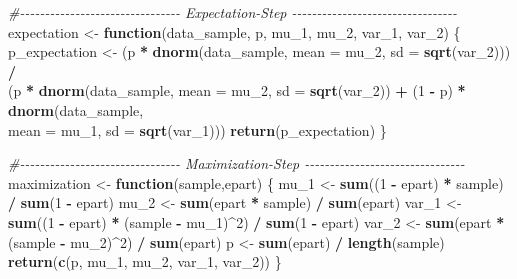 \documentclass[
]{article}
\newenvironment{Shaded}{\begin{snugshade}}{\end{snugshade}}
\newcommand{\AttributeTok}[1]{\textcolor[rgb]{0.13,0.29,0.53}{#1}}
\newcommand{\CommentTok}[1]{\textcolor[rgb]{0.56,0.35,0.01}{\textit{#1}}}
\newcommand{\ControlFlowTok}[1]{\textcolor[rgb]{0.13,0.29,0.53}{\textbf{#1}}}
\newcommand{\DecValTok}[1]{\textcolor[rgb]{0.00,0.00,0.81}{#1}}
\newcommand{\FunctionTok}[1]{\textcolor[rgb]{0.13,0.29,0.53}{\textbf{#1}}}
\newcommand{\NormalTok}[1]{#1}
\newcommand{\OtherTok}[1]{\textcolor[rgb]{0.56,0.35,0.01}{#1}}
\newcommand{\SpecialCharTok}[1]{\textcolor[rgb]{0.81,0.36,0.00}{\textbf{#1}}}
\begin{document}
\begin{Shaded}
\begin{Highlighting}[]
\CommentTok{\#{-}{-}{-}{-}{-}{-}{-}{-}{-}{-}{-}{-}{-}{-}{-}{-}{-}{-}{-}{-}{-}{-}{-}{-}{-}{-}{-}{-}{-}{-}{-}{-} Expectation{-}Step {-}{-}{-}{-}{-}{-}{-}{-}{-}{-}{-}{-}{-}{-}{-}{-}{-}{-}{-}{-}{-}{-}{-}{-}{-}{-}{-}{-}{-}{-}{-}{-}{-}}
\NormalTok{expectation }\OtherTok{\textless{}{-}} \ControlFlowTok{function}\NormalTok{(data\_sample, p, mu\_1, mu\_2, var\_1, var\_2) \{}
\NormalTok{  p\_expectation }\OtherTok{\textless{}{-}}\NormalTok{ (p }\SpecialCharTok{*} \FunctionTok{dnorm}\NormalTok{(data\_sample, }\AttributeTok{mean =}\NormalTok{ mu\_2, }\AttributeTok{sd =} \FunctionTok{sqrt}\NormalTok{(var\_2))) }\SpecialCharTok{/}\\
\NormalTok{ (p }\SpecialCharTok{*} \FunctionTok{dnorm}\NormalTok{(data\_sample, }\AttributeTok{mean =}\NormalTok{ mu\_2, }\AttributeTok{sd =} \FunctionTok{sqrt}\NormalTok{(var\_2)) }\SpecialCharTok{+}\NormalTok{ (}\DecValTok{1} \SpecialCharTok{{-}}\NormalTok{ p) }\SpecialCharTok{*} \FunctionTok{dnorm}\NormalTok{(data\_sample, }\\
\AttributeTok{mean =}\NormalTok{ mu\_1, }\AttributeTok{sd =} \FunctionTok{sqrt}\NormalTok{(var\_1)))}
  \FunctionTok{return}\NormalTok{(p\_expectation)}
\NormalTok{\}}

\CommentTok{\#{-}{-}{-}{-}{-}{-}{-}{-}{-}{-}{-}{-}{-}{-}{-}{-}{-}{-}{-}{-}{-}{-}{-}{-}{-}{-}{-}{-}{-}{-}{-}{-} Maximization{-}Step {-}{-}{-}{-}{-}{-}{-}{-}{-}{-}{-}{-}{-}{-}{-}{-}{-}{-}{-}{-}{-}{-}{-}{-}{-}{-}{-}{-}{-}{-}{-}{-}}
\NormalTok{maximization }\OtherTok{\textless{}{-}} \ControlFlowTok{function}\NormalTok{(sample,epart) \{}
\NormalTok{  mu\_1 }\OtherTok{\textless{}{-}} \FunctionTok{sum}\NormalTok{((}\DecValTok{1} \SpecialCharTok{{-}}\NormalTok{ epart) }\SpecialCharTok{*}\NormalTok{ sample) }\SpecialCharTok{/} \FunctionTok{sum}\NormalTok{(}\DecValTok{1} \SpecialCharTok{{-}}\NormalTok{ epart)}
\NormalTok{  mu\_2 }\OtherTok{\textless{}{-}} \FunctionTok{sum}\NormalTok{(epart }\SpecialCharTok{*}\NormalTok{ sample) }\SpecialCharTok{/} \FunctionTok{sum}\NormalTok{(epart)}
\NormalTok{  var\_1 }\OtherTok{\textless{}{-}} \FunctionTok{sum}\NormalTok{((}\DecValTok{1} \SpecialCharTok{{-}}\NormalTok{ epart) }\SpecialCharTok{*}\NormalTok{ (sample }\SpecialCharTok{{-}}\NormalTok{ mu\_1)}\SpecialCharTok{\^{}}\DecValTok{2}\NormalTok{) }\SpecialCharTok{/} \FunctionTok{sum}\NormalTok{(}\DecValTok{1} \SpecialCharTok{{-}}\NormalTok{ epart)}
\NormalTok{  var\_2 }\OtherTok{\textless{}{-}} \FunctionTok{sum}\NormalTok{(epart }\SpecialCharTok{*}\NormalTok{ (sample }\SpecialCharTok{{-}}\NormalTok{ mu\_2)}\SpecialCharTok{\^{}}\DecValTok{2}\NormalTok{) }\SpecialCharTok{/} \FunctionTok{sum}\NormalTok{(epart)}
\NormalTok{  p }\OtherTok{\textless{}{-}} \FunctionTok{sum}\NormalTok{(epart) }\SpecialCharTok{/} \FunctionTok{length}\NormalTok{(sample)}
  \FunctionTok{return}\NormalTok{(}\FunctionTok{c}\NormalTok{(p, mu\_1, mu\_2, var\_1, var\_2))}
\NormalTok{\}}


\end{Highlighting}
\end{Shaded}
\end{document}
